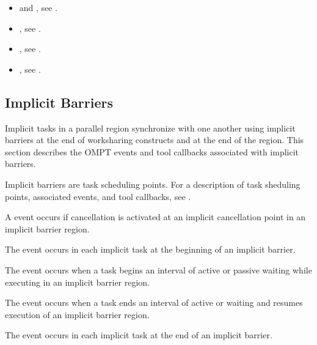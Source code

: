 \crossreferences
\begin{itemize}
\item {} and , see
.

\item {}, see  
.

\item {}, see
.

\item {}, see 
.

\end{itemize}






\subsection{Implicit Barriers}
\label{subsec:implict-barrier}

Implicit tasks in a parallel region synchronize with one another using
implicit barriers at the end of worksharing constructs and at the end
of the  region. This section describes the OMPT events and
tool callbacks associated with implicit barriers.

Implicit barriers are task scheduling points. For a description of
task sheduling points, associated events, and tool callbacks, see
.

\events

A  event occurs if cancellation is activated at an
implicit cancellation point in an implicit barrier region.

The  event occurs in each implicit task
at the beginning of an implicit barrier.

The  event occurs when a task begins an interval of
active or passive waiting while executing in an implicit barrier region.

The  event occurs when a task ends an interval of 
active or waiting and resumes execution of an implicit barrier region.

The  event occurs in each implicit task
at the end of an implicit barrier.

